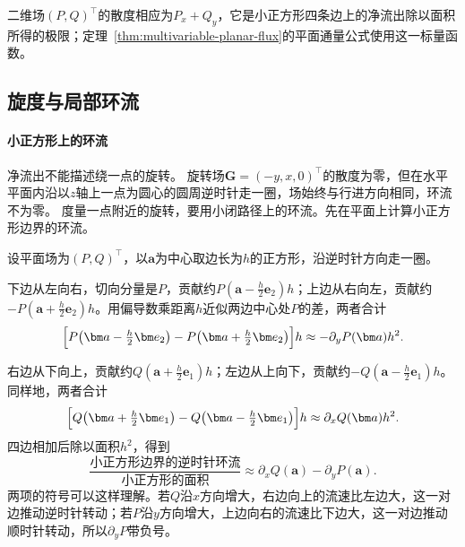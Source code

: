 二维场$(P,Q)^\top$的散度相应为$P_x+Q_y$，它是小正方形四条边上的净流出除以面积所得的极限；定理~\ref{thm:multivariable-planar-flux}的平面通量公式使用这一标量函数。

\subsection{旋度与局部环流}

\paragraph{小正方形上的环流}

净流出不能描述绕一点的旋转。
旋转场$\bm G=(-y,x,0)^\top$的散度为零，但在水平平面内沿以$z$轴上一点为圆心的圆周逆时针走一圈，场始终与行进方向相同，环流不为零。
度量一点附近的旋转，要用小闭路径上的环流。先在平面上计算小正方形边界的环流。

设平面场为$(P,Q)^\top$，以$\bm a$为中心取边长为$h$的正方形，沿逆时针方向走一圈。

下边从左向右，切向分量是$P$，贡献约$P(\bm a-\tfrac h2\bm e_2)h$；上边从右向左，贡献约$-P(\bm a+\tfrac h2\bm e_2)h$。用偏导数乘距离$h$近似两边中心处$P$的差，两者合计
\[
 \Bigl[P\bigl(\bm a-\tfrac h2\bm e_2\bigr)-P\bigl(\bm a+\tfrac h2\bm e_2\bigr)\Bigr]h
 \approx-\partial_yP(\bm a)h^2.
\]

右边从下向上，贡献约$Q(\bm a+\tfrac h2\bm e_1)h$；左边从上向下，贡献约$-Q(\bm a-\tfrac h2\bm e_1)h$。同样地，两者合计
\[
 \Bigl[Q\bigl(\bm a+\tfrac h2\bm e_1\bigr)-Q\bigl(\bm a-\tfrac h2\bm e_1\bigr)\Bigr]h
 \approx\partial_xQ(\bm a)h^2.
\]
四边相加后除以面积$h^2$，得到
\[
 \frac{\text{小正方形边界的逆时针环流}}{\text{小正方形的面积}}
 \approx\partial_xQ(\bm a)-\partial_yP(\bm a).
\]
两项的符号可以这样理解。若$Q$沿$x$方向增大，右边向上的流速比左边大，这一对边推动逆时针转动；若$P$沿$y$方向增大，上边向右的流速比下边大，这一对边推动顺时针转动，所以$\partial_yP$带负号。

